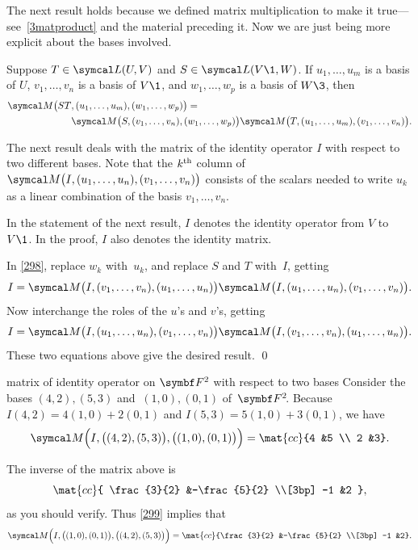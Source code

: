 The next result holds because we defined matrix multiplication to
make it true---see~\ref{3matproduct} and the material preceding it. Now we are just being more explicit about the bases involved.

{Suppose $T \in \L(U, V)$ and $S \in \L(V\1, W)$. If $u_1, \dots, u_m$ is a basis of $U$, $v_1, \dots, v_n$ is a basis of $V\1$, and
$w_1, \dots, w_p$ is a basis of $W\3$, then
\begin{align*}
\M\bigl(ST&, (u_1, \dots, u_m), (w_1, \dots, w_p) \bigr) = \\
&\M\bigl(S, (v_1, \dots, v_n), (w_1, \dots, w_p) \bigr)
\M\bigl(T, (u_1, \dots, u_m), (v_1, \dots, v_n) \bigr).
\end{align*}}

The next result deals with the matrix of the identity operator $I$ with respect to two different bases.  Note that the $k^{{\text{{th}}}}$ column of
$\M\bigl(I, (u_1, \dots, u_n), (v_1, \dots, v_n)\bigr)$ consists of the scalars needed to write $u_k$ as a linear combination of the basis
$v_1, \dots, v_n$.

In the statement of the next result, $I$ denotes the identity operator from $V$ to $V\1$. In the proof, $I$ also denotes the  identity matrix.


\proof
In \ref{298}, replace $w_k$ with~$u_k$, and replace
$S$ and $T$ with~$I$, getting
\[
I = \M\bigl(I, (v_1, \dots, v_n), (u_1, \dots, u_n) \bigr)
\M\bigl(I, (u_1, \dots, u_n), (v_1, \dots, v_n) \bigr).
\]
Now interchange the roles of the $u$'s and $v$'s, getting
\[
I = \M\bigl(I, (u_1, \dots, u_n), (v_1, \dots, v_n) \bigr)
\M\bigl(I, (v_1, \dots, v_n), (u_1, \dots, u_n) \bigr).
\]
These two equations above give the desired result.
\qed

\begin{example}{matrix of identity operator on\/ $\F2$ with respect to two bases}
Consider the bases $ (4, 2), (5, 3)$ and $\ (1, 0), (0, 1) $ of~$\FF{2}$. Because $I(4,2) = 4(1,0) + 2(0,1)$ and $I(5, 3) = 5(1,0) + 3(0, 1)$, we have
\[
\M\Bigl(I, \bigl((4, 2), (5, 3)\bigr), \bigl((1, 0), (0, 1)\bigr) \Bigr) =
\mat{cc}{4 &5 \\ 2 &3}.
\]

The inverse of the matrix above is
\[
\mat{cc}{ \frac{3}{2} &-\frac{5}{2} \\[3bp] -1 &2 },
\]
as you should verify.  Thus \ref{299} implies that
\[
\M\Bigl(I, \bigl((1, 0), (0, 1)\bigr), \bigl((4, 2), (5, 3)\bigr) \Bigr) =
\mat{cc}{\frac{3}{2} &-\frac{5}{2} \\[3bp] -1 &2}.
\]
\vspace{-12bp}
\end{example}

